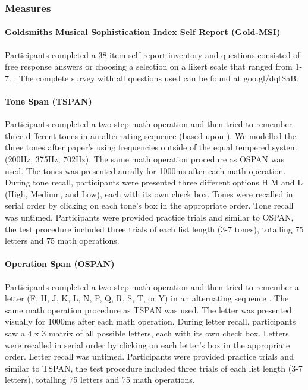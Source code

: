 \documentclass[]{book}
\let\oldparagraph\paragraph
\renewcommand{\paragraph}[1]{\oldparagraph{#1}\mbox{}}
\begin{document}
\hypertarget{measures}{%
\subsubsection{Measures}\label{measures}}

\hypertarget{goldsmiths-musical-sophistication-index-self-report-gold-msi}{%
\paragraph{Goldsmiths Musical Sophistication Index Self Report (Gold-MSI)}\label{goldsmiths-musical-sophistication-index-self-report-gold-msi}}

Participants completed a 38-item self-report inventory and questions consisted of free response answers or choosing a
selection on a likert scale that ranged from 1-7. \citep{mullensiefenMusicalityNonMusiciansIndex2014}.
The complete survey with all questions used can be found at goo.gl/dqtSaB.

\hypertarget{tone-span-tspan}{%
\paragraph{Tone Span (TSPAN)}\label{tone-span-tspan}}

Participants completed a two-step math operation and then tried to remember three different tones in an alternating sequence (based upon \citet{unsworthAutomatedVersionOperation2005}).
We modelled the three tones after \citet{liEstimatingWorkingMemory2013} paper's using frequencies outside of the equal tempered system (200Hz, 375Hz, 702Hz).
The same math operation procedure as OSPAN was used.
The tones was presented aurally for 1000ms after each math operation.
During tone recall, participants were presented three different options H M and L (High, Medium, and Low), each with its own check box.
Tones were recalled in serial order by clicking on each tone's box in the appropriate order.
Tone recall was untimed.
Participants were provided practice trials and similar to OSPAN, the test procedure included three trials of each list length (3-7 tones), totalling 75 letters and 75 math operations.

\hypertarget{operation-span-ospan}{%
\paragraph{Operation Span (OSPAN)}\label{operation-span-ospan}}

Participants completed a two-step math operation and then tried to remember a letter (F, H, J, K, L, N, P, Q, R, S, T, or
Y) in an alternating sequence \citep{unsworthAutomatedVersionOperation2005}.
The same math operation procedure as TSPAN was used.
The letter was presented visually for 1000ms after each math
operation.
During letter recall, participants saw a 4 x 3 matrix of all possible letters, each with its own check box.
Letters were recalled in serial order by clicking on each letter's box in the appropriate order.
Letter recall was untimed.
Participants were provided practice trials and similar to TSPAN, the test procedure included three trials of each list length (3-7 letters), totalling 75 letters and 75 math operations.
\end{document}
